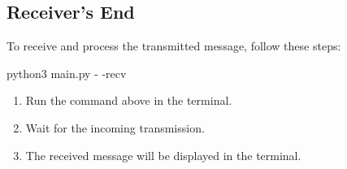 \documentclass[11pt]{article}
\begin{document}
\subsection*{Receiver's End}

To receive and process the transmitted message, follow these steps:

\begin{tcolorbox}
    python3 main.py - \hspace{-0.1cm}-recv
\end{tcolorbox}

\begin{enumerate}
    \item Run the command above in the terminal.
    \item Wait for the incoming transmission.
    \item The received message will be displayed in the terminal.
\end{enumerate}
\end{document}
